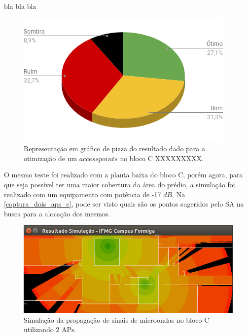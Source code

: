 \documentclass[
	12pt,				%
	twoside,			%
	a4paper,			%
	english,			%
	french,				%
	spanish,			%
	brazil				%
	]{abntex2}
\begin{document}
bla bla bla

\begin{figure}[ht]
    \caption{\label{percent_bloco_a_2} Representação em gráfico de pizza do resultado dado para a otimização
     de um $access points$ no bloco C XXXXXXXXX. }
    \begin{center}
        \includegraphics[scale=0.7]{imagens/percent-bloco-a-2.png}
    \end{center}
\end{figure}

O mesmo teste foi realizado com a planta baixa do bloco C, porém agora,
para que seja possível ter uma maior cobertura da área do prédio, a
simulação foi realizado com um equipamento com potência de -17 \(dB\).
Na \autoref{captura_dois_aps_c}, pode ser visto quais são os pontos
sugeridos pelo SA na busca para a alocação dos mesmos.

\begin{figure}[ht]
    \caption{\label{captura_dois_aps_c} Simulação da propagação de sinais de microondas no bloco C utilizando 2 APs.
    }
    \begin{center}
        \includegraphics[scale=0.7]{imagens/captura-2-aps-bloco-c-2.jpg}
    \end{center}
\end{figure}
\end{document}
